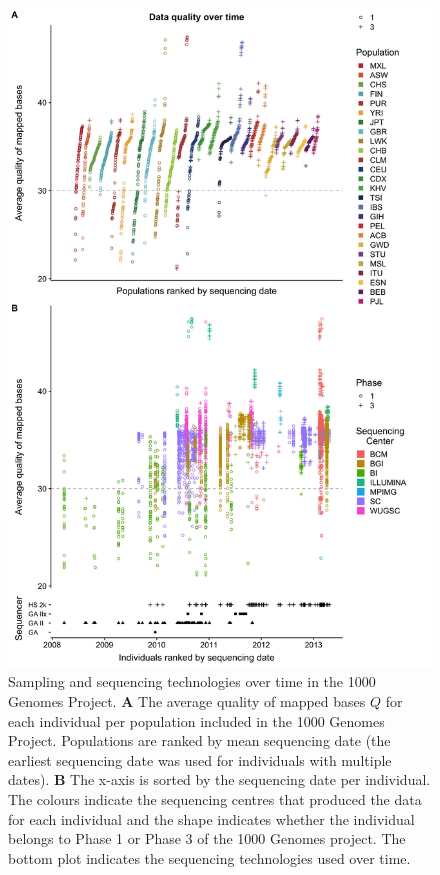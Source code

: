 \documentclass[9pt,lineno]{template}
\begin{document}
\begin{figure}
\includegraphics[width=0.95\hsize,keepaspectratio]{../Figures/MapQualOverTime.jpg}

\caption{Sampling and sequencing technologies over time in the 1000 Genomes Project.
\textbf{A} The average quality of mapped bases $Q$ for each individual per population included in the 1000 Genomes Project. 
 Populations are ranked by mean sequencing date (the earliest sequencing date was used for individuals with multiple dates). 
 \textbf{B} The x-axis is sorted by the sequencing date per individual. 
The colours indicate the sequencing centres that produced the data for each individual and the shape indicates whether the individual belongs to Phase 1 or Phase 3 of the 1000 Genomes project. 
The bottom plot indicates the sequencing technologies used over time.}
\label{MapQual}
\end{figure}
\end{document}
